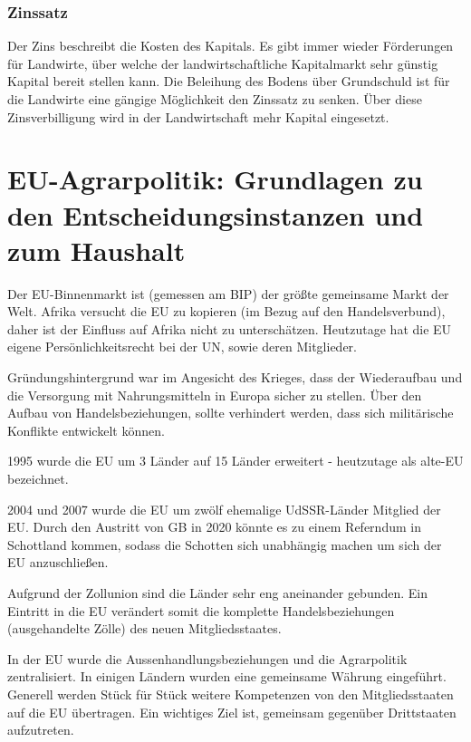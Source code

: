 \documentclass[11pt]{scrbook}
\begin{document}
\subsubsection{Zinssatz}
Der Zins beschreibt die Kosten des Kapitals.
Es gibt immer wieder Förderungen für Landwirte, über welche der landwirtschaftliche Kapitalmarkt sehr günstig Kapital bereit stellen kann.
Die Beleihung des Bodens über Grundschuld ist für die Landwirte eine gängige Möglichkeit den Zinssatz zu senken.
Über diese Zinsverbilligung wird in der Landwirtschaft mehr Kapital eingesetzt.

\section{\ac{EU}-Agrarpolitik: Grundlagen zu den Entscheidungsinstanzen und zum Haushalt}

Der \ac{EU}-Binnenmarkt ist (gemessen am \ac{BIP}) der größte gemeinsame Markt der Welt.
Afrika versucht die \ac{EU} zu kopieren (im Bezug auf den Handelsverbund), daher ist der Einfluss auf Afrika nicht zu unterschätzen.
Heutzutage hat die \ac{EU} eigene Persönlichkeitsrecht bei der \ac{UN}, sowie deren Mitglieder.

Gründungshintergrund war im Angesicht des Krieges, dass der Wiederaufbau und die Versorgung mit Nahrungsmitteln in Europa sicher zu stellen.
Über den Aufbau von Handelsbeziehungen, sollte verhindert werden, dass sich militärische Konflikte entwickelt können.

1995 wurde die \ac{EU} um 3 Länder auf 15 Länder erweitert - heutzutage als \glqq alte\grqq{}-\ac{EU} bezeichnet.

2004 und 2007 wurde die \ac{EU} um zwölf ehemalige \ac{UdSSR}-Länder Mitglied der \ac{EU}.
Durch den Austritt von \ac{GB} in 2020 könnte es zu einem Referndum in Schottland kommen, sodass die Schotten sich unabhängig machen um sich der \ac{EU} anzuschließen.

Aufgrund der Zollunion sind die Länder sehr eng aneinander gebunden.
Ein Eintritt in die \ac{EU} verändert somit die komplette Handelsbeziehungen (ausgehandelte Zölle) des neuen Mitgliedsstaates.

In der \ac{EU} wurde die Aussenhandlungsbeziehungen und die Agrarpolitik zentralisiert.
In einigen Ländern wurden eine gemeinsame Währung eingeführt.
Generell werden Stück für Stück weitere Kompetenzen von den Mitgliedsstaaten auf die \ac{EU} übertragen.
Ein wichtiges Ziel ist, gemeinsam gegenüber Drittstaaten aufzutreten.
\end{document}
